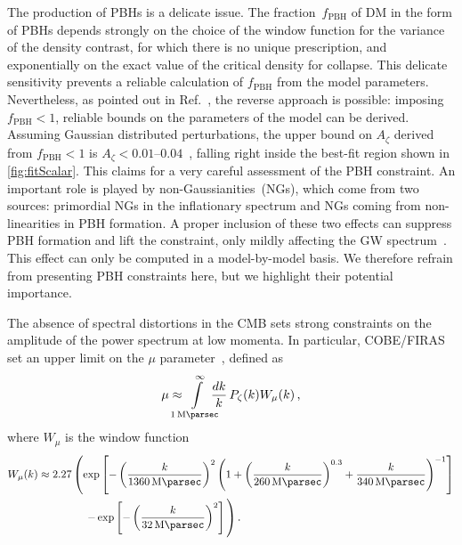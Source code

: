 \documentclass{article}
\begin{document}
The production of PBHs is a delicate issue. The fraction~$f_\mathrm{PBH}$ of DM in the form of PBHs depends strongly on the choice of the window function for the variance of the density contrast, for which there is no unique prescription, and exponentially on the exact value of the critical density for collapse. This delicate sensitivity prevents a reliable calculation of $f_\mathrm{PBH}$ from the model parameters. Nevertheless, as pointed out in Ref.~\cite{Dandoy:2023jot}, the reverse approach is possible: imposing $f_\mathrm{PBH}< 1$, reliable bounds on the parameters of the model can be derived.
%
Assuming Gaussian distributed perturbations, the upper bound on $A_\zeta$ derived from $f_\mathrm{PBH}< 1$ is $A_\zeta < \numrange{0.01}{0.04}$~\cite{Dandoy:2023jot}, falling right inside the best-fit region shown in \cref{fig:fitScalar}. This claims for a very careful assessment of the PBH constraint.
%
An important role is played by non-Gaussianities~(NGs), which come from two sources: primordial NGs in the inflationary spectrum and NGs coming from non-linearities in PBH formation.
A proper inclusion of these two effects can suppress PBH formation and lift the constraint, only mildly affecting the GW spectrum~\cite{Ferrante:2023bgz}. This effect can only be computed in a model-by-model basis. We therefore refrain from presenting PBH constraints here, but we highlight their potential importance.

\medskip

The absence of spectral distortions in the CMB sets strong constraints on the amplitude of the power spectrum at low momenta. In particular, COBE/FIRAS set an upper limit on the $\mu$ parameter~\cite{Mather:1993ij, Fixsen:1996nj}, defined as
\begin{equation}\label{eq:mu parameter}
    \mu \approx \hspace{-10pt}\int\limits_{\SI{1}{\per\mega\parsec}}^\infty \hspace{-10pt}\frac{dk}{k}\, P_\zeta(k) W_\mu (k) \,,
\end{equation}
where $W_\mu$ is the window function~\cite{Chluba:2015bqa} 
%
\begin{align}
        W_\mu (k) &\approx 2.27\left(\exp\left[-\left(\frac{k}{\SI{1360}{\per\mega\parsec}}\right)^2\left(1+\left(\frac{k}{\SI{260}{\per\mega\parsec}}\right)^{0.3}+\frac{k}{\SI{340}{\per\mega\parsec}}\right)^{-1}\right]\right.\\
    &\hspace{1.5cm}\left.-\exp\left[-\left(\frac{k}{\SI{32}{\per\mega\parsec}}\right)^2\right]\vphantom{\left[\left(\left(\frac{1}{1}\right)^{0.3}\right)^{-1}\right]}\right).\nonumber
\end{align}
\end{document}
